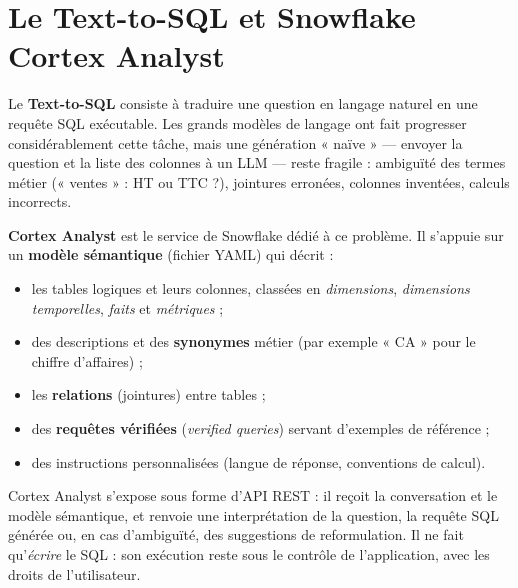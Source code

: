 \section{Le Text-to-SQL et Snowflake Cortex Analyst}

Le \textbf{Text-to-SQL} consiste à traduire une question en langage naturel en une requête SQL
exécutable. Les grands modèles de langage ont fait progresser considérablement cette tâche, mais une
génération « naïve » --- envoyer la question et la liste des colonnes à un LLM --- reste fragile :
ambiguïté des termes métier (« ventes » : HT ou TTC ?), jointures erronées, colonnes inventées,
calculs incorrects.

\textbf{Cortex Analyst} est le service de Snowflake dédié à ce problème. Il s'appuie sur un
\textbf{modèle sémantique} (fichier YAML) qui décrit :
\begin{itemize}
  \item les tables logiques et leurs colonnes, classées en \emph{dimensions}, \emph{dimensions
        temporelles}, \emph{faits} et \emph{métriques} ;
  \item des descriptions et des \textbf{synonymes} métier (par exemple « CA » pour le chiffre d'affaires) ;
  \item les \textbf{relations} (jointures) entre tables ;
  \item des \textbf{requêtes vérifiées} (\emph{verified queries}) servant d'exemples de référence ;
  \item des instructions personnalisées (langue de réponse, conventions de calcul).
\end{itemize}

Cortex Analyst s'expose sous forme d'API REST : il reçoit la conversation et le modèle sémantique, et
renvoie une interprétation de la question, la requête SQL générée ou, en cas d'ambiguïté, des
suggestions de reformulation. Il ne fait qu'\emph{écrire} le SQL : son exécution reste sous le
contrôle de l'application, avec les droits de l'utilisateur.
